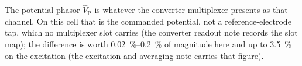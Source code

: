 \noindent The potential phasor \(\hat{V}_{\mathrm{P}}\) is whatever the
converter multiplexer presents as that channel. On this cell that is the commanded potential,
not a reference-electrode tap, which no multiplexer slot carries
(the converter readout note records the slot map); the difference is worth
\SIrange{0.02}{0.2}{\percent} of magnitude here and up to \SI{3.5}{\percent} on
the excitation (the excitation and averaging note carries that figure).
